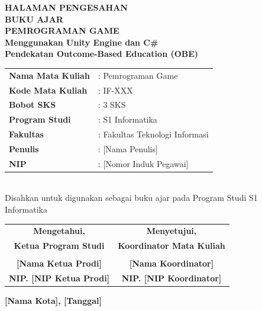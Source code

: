 
\newpage
\thispagestyle{empty}
\begin{center}
\vspace*{2cm}

\textbf{\Large HALAMAN PENGESAHAN}\\[1cm]

\textbf{BUKU AJAR}\\[0.5cm]
\textbf{PEMROGRAMAN GAME}\\[0.3cm]
\textbf{Menggunakan Unity Engine dan C\#}\\[0.3cm]
\textbf{Pendekatan Outcome-Based Education (OBE)}\\[1.5cm]

\begin{tabular}{ll}
\textbf{Nama Mata Kuliah} & : Pemrograman Game \\
\textbf{Kode Mata Kuliah} & : IF-XXX \\
\textbf{Bobot SKS} & : 3 SKS \\
\textbf{Program Studi} & : S1 Informatika \\
\textbf{Fakultas} & : Fakultas Teknologi Informasi \\
\textbf{Penulis} & : [Nama Penulis] \\
\textbf{NIP} & : [Nomor Induk Pegawai] \\
\end{tabular}\\[2cm]

Disahkan untuk digunakan sebagai buku ajar pada Program Studi S1 Informatika\\[1cm]

\vfill

\begin{tabular}{cc}
\textbf{Mengetahui,} & \textbf{Menyetujui,} \\
\textbf{Ketua Program Studi} & \textbf{Koordinator Mata Kuliah} \\[2cm]
\underline{\hspace{4cm}} & \underline{\hspace{4cm}} \\
\textbf{[Nama Ketua Prodi]} & \textbf{[Nama Koordinator]} \\
\textbf{NIP. [NIP Ketua Prodi]} & \textbf{NIP. [NIP Koordinator]} \\[1cm]
\end{tabular}

\vspace{1cm}
\textbf{[Nama Kota], [Tanggal]}

\end{center}
